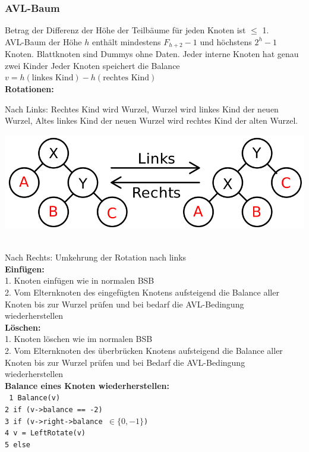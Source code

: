 \documentclass[fs, footer]{latex4ei}
\renewcommand{\t}{\texttt}
\begin{document}
\begin{multicols*}{4}
{{\subsubsection{AVL-Baum}
Betrag der Differenz der Höhe der Teilbäume für jeden Knoten ist $\leq$ 1.\\
AVL-Baum der Höhe $h$ enthält mindestens $F_{h+2}-1$ und höchstens $2^h - 1$ Knoten.
Blattknoten sind Dummys ohne Daten. Jeder interne Knoten hat genau zwei Kinder
Jeder Knoten speichert die Balance $v = h(\text{linkes Kind}) - h(\text{rechtes Kind})$\\
\textbf{Rotationen:}\\
\parbox{.5\linewidth}{
Nach Links: Rechtes Kind wird Wurzel, Wurzel wird linkes Kind der neuen Wurzel, Altes linkes Kind der neuen Wurzel wird rechtes Kind der alten Wurzel.}\parbox{.5\linewidth}{\vspace{-.3cm}
\includegraphics[width=\linewidth]{img/avl-rotate}}\\
Nach Rechts: Umkehrung der Rotation nach links\\
\textbf{Einfügen:}\\
1. Knoten einfügen wie in normalen BSB\\
2. Vom Elternknoten des eingefügten Knotens aufsteigend die Balance aller Knoten bis zur Wurzel prüfen und bei bedarf die AVL-Bedingung wiederherstellen\\
\textbf{Löschen:}\\
1. Knoten löschen wie im normalen BSB\\
2. Vom Elternknoten des überbrücken Knotens aufsteigend die Balance aller Knoten bis zur Wurzel prüfen und bei Bedarf die AVL-Bedingung wiederherstellen\\
\textbf{Balance eines Knoten wiederherstellen:}\\
\t{
 1\ Balance(v)\\
 2\ if (v->balance == -2)\\
 3\ \quad if (v->right->balance $\in \{0, -1\}$)\\
 4\ \qquad   v = LeftRotate(v)\\
 5\ \quad else\\
}}}
\end{multicols*}
\end{document}
